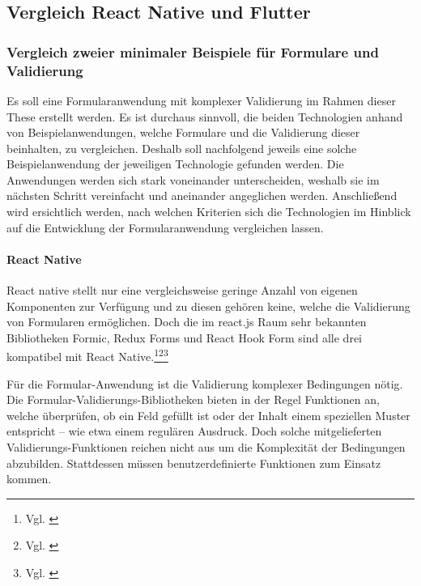 
\subsection{Vergleich React Native und Flutter}

\subsubsection{Vergleich zweier minimaler Beispiele für Formulare und Validierung}


Es soll eine Formularanwendung mit komplexer Validierung im Rahmen dieser These erstellt werden. Es ist durchaus sinnvoll, die beiden Technologien anhand von  Beispielanwendungen, welche Formulare und die Validierung dieser  beinhalten,   zu vergleichen.  Deshalb soll nachfolgend  jeweils eine solche Beispielanwendung der jeweiligen Technologie gefunden werden. Die Anwendungen werden sich stark voneinander unterscheiden, weshalb sie im nächsten Schritt vereinfacht und aneinander angeglichen werden.  Anschließend wird ersichtlich werden, nach welchen Kriterien sich die Technologien im Hinblick auf die Entwicklung der Formularanwendung vergleichen lassen.

\paragraph{React Native}

React native stellt nur eine vergleichsweise geringe Anzahl von eigenen Komponenten zur Verfügung und zu diesen gehören keine, welche die Validierung von Formularen ermöglichen. Doch die im react.js Raum sehr bekannten Bibliotheken Formic, Redux Forms und React Hook Form sind alle drei kompatibel mit React Native.\footnote{Vgl. \cite{ReactNativeFormikDocs}}\footnote{Vgl. \cite{DoesReduxFormWorkWithReactNative}}\footnote{Vgl. \cite{ReactNativeReactHookFormGetStarted}}




Für die Formular-Anwendung ist die Validierung komplexer Bedingungen nötig. Die Formular-Validierungs-Bibliotheken bieten in der Regel Funktionen an, welche überprüfen, ob ein Feld gefüllt ist oder der Inhalt einem speziellen Muster entspricht – wie etwa einem regulären Ausdruck. Doch solche mitgelieferten Validierungs-Funktionen reichen nicht aus um die Komplexität der Bedingungen abzubilden. Stattdessen müssen benutzerdefinierte Funktionen zum Einsatz kommen.

